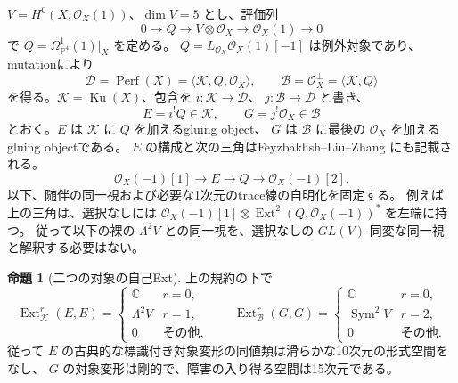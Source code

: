 \documentclass[a4paper,11pt]{ltjsarticle}
\theoremstyle{definition}
\newtheorem{theorem}{命題}[section]
\newcommand{\CC}{\mathbb C}
\newcommand{\OO}{\mathcal O}
\newcommand{\PP}{\mathbb P}
\newcommand{\Ku}{\operatorname{Ku}}
\newcommand{\Sym}{\operatorname{Sym}}
\newcommand{\Ext}{\operatorname{Ext}}
\newcommand{\Perf}{\operatorname{Perf}}
\begin{document}
$V=H^0(X,\OO_X(1))$、$\dim V=5$ とし、評価列
\[
 0\longrightarrow Q\longrightarrow V\otimes\OO_X
 \longrightarrow\OO_X(1)\longrightarrow0
\]
で $Q=\Omega^1_{\PP^4}(1)|_X$ を定める。
$Q=L_{\OO_X}\OO_X(1)[-1]$ は例外対象であり、mutationにより
\[
 \mathcal D=\Perf(X)=\langle\mathcal K,Q,\OO_X\rangle,\qquad
 \mathcal B=\OO_X^\perp=\langle\mathcal K,Q\rangle
\]
を得る。$\mathcal K=\Ku(X)$、包含を $i:\mathcal K\to\mathcal D$、
$j:\mathcal B\to\mathcal D$ と書き、
\[
 E=i^!Q\in\mathcal K,\qquad G=j^!\OO_X\in\mathcal B
\]
とおく。$E$ は $\mathcal K$ に $Q$ を加えるgluing object、
$G$ は $\mathcal B$ に最後の $\OO_X$ を加えるgluing objectである。
$E$ の構成と次の三角はFeyzbakhsh--Liu--Zhang
\cite[Section 3.2, equations (9)--(12)]{FLZ}にも記載される。
\[
 \OO_X(-1)[1]\longrightarrow E\longrightarrow Q
 \longrightarrow\OO_X(-1)[2]. \tag{E}\label{eq:E-triangle}
\]
以下、随伴の同一視および必要な1次元のtrace線の自明化を固定する。
例えば上の三角は、選択なしには
$\OO_X(-1)[1]\otimes\Ext^2(Q,\OO_X(-1))^*$ を左端に持つ。
従って以下の裸の $\Lambda^2V$ との同一視を、選択なしの
$GL(V)$-同変な同一視と解釈する必要はない。

\begin{theorem}[二つの対象の自己Ext]\label{thm:gluing-ext}
上の規約の下で
\[
 \Ext^r_{\mathcal K}(E,E)=
 \begin{cases}\CC&r=0,\\ \Lambda^2V&r=1,\\0&\text{その他},\end{cases}
 \qquad
 \Ext^r_{\mathcal B}(G,G)=
 \begin{cases}\CC&r=0,\\ \Sym^2V&r=2,\\0&\text{その他}.\end{cases}
\]
従って $E$ の古典的な標識付き対象変形の同値類は滑らかな10次元の形式空間をなし、
$G$ の対象変形は剛的で、障害の入り得る空間は15次元である。
\end{theorem}
\end{document}
